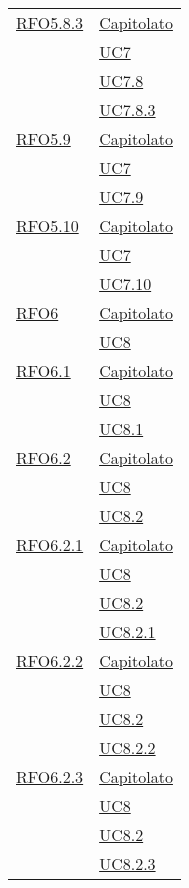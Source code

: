 \begin{longtable}{|>{\centering}m{5cm}|m{5cm}<{\centering}|}
 \hyperlink{RFO5.8.3}{RFO5.8.3} & \hyperlink{Capitolato}{Capitolato}\\
 & \hyperref[UC7]{UC7}\\
 & \hyperref[UC7.8]{UC7.8}\\
 & \hyperref[UC7.8.3]{UC7.8.3}\\
 \hline
 
 \hyperlink{RFO5.9}{RFO5.9} & \hyperlink{Capitolato}{Capitolato}\\
 & \hyperref[UC7]{UC7}\\
 & \hyperref[UC7.9]{UC7.9}\\\hline
 
\hyperlink{RFO5.10}{RFO5.10} & \hyperlink{Capitolato}{Capitolato}\\
 & \hyperref[UC7]{UC7}\\
 & \hyperref[UC7.10]{UC7.10}\\\hline
 
 \hyperlink{RFO6}{RFO6} & \hyperlink{Capitolato}{Capitolato}\\
 & \hyperref[UC8]{UC8}\\\hline
 
 \hyperlink{RFO6.1}{RFO6.1} & \hyperlink{Capitolato}{Capitolato}\\
 & \hyperref[UC8]{UC8}\\
 & \hyperref[UC8.1]{UC8.1}\\\hline
 
 \hyperlink{RFO6.2}{RFO6.2} & \hyperlink{Capitolato}{Capitolato}\\
 & \hyperref[UC8]{UC8}\\
 & \hyperref[UC8.2]{UC8.2}\\\hline
 
 \hyperlink{RFO6.2.1}{RFO6.2.1} & \hyperlink{Capitolato}{Capitolato}\\
 & \hyperref[UC8]{UC8}\\
 & \hyperref[UC8.2]{UC8.2}\\
  & \hyperref[UC8.2.1]{UC8.2.1}\\\hline
  
   \hyperlink{RFO6.2.2}{RFO6.2.2} & \hyperlink{Capitolato}{Capitolato}\\
  & \hyperref[UC8]{UC8}\\
  & \hyperref[UC8.2]{UC8.2}\\
  & \hyperref[UC8.2.2]{UC8.2.2}\\\hline
  
   \hyperlink{RFO6.2.3}{RFO6.2.3} & \hyperlink{Capitolato}{Capitolato}\\
  & \hyperref[UC8]{UC8}\\
  & \hyperref[UC8.2]{UC8.2}\\
  & \hyperref[UC8.2.3]{UC8.2.3}\\\hline
  

\end{longtable}
